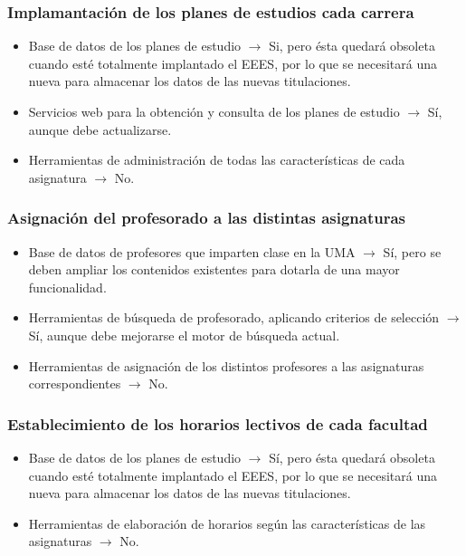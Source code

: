 \documentclass[11pt,a4paper,spanish,twoside]{book}
\begin{document}
\subsubsection{Implamantación de los planes de estudios cada carrera}
\begin{itemize}
\item Base de datos de los planes de estudio $\to$ Si, pero ésta quedará
  obsoleta cuando esté totalmente implantado el EEES, por lo que se
  necesitará una nueva para almacenar los datos de las nuevas titulaciones. 
\item Servicios web para la obtención y consulta de los planes de estudio
  $\to$ Sí, aunque debe actualizarse. 
\item Herramientas de administración de todas las características de cada
  asignatura $\to$ No. 
\end{itemize}

\subsubsection{Asignación del profesorado a las distintas asignaturas}
\begin{itemize}
\item Base de datos de profesores que imparten clase en la UMA $\to$ Sí, pero
  se deben ampliar los contenidos existentes para dotarla de una mayor
  funcionalidad. 
\item Herramientas de búsqueda de profesorado, aplicando criterios de
  selección $\to$ Sí, aunque debe mejorarse el motor de búsqueda actual. 
\item Herramientas de asignación de los distintos profesores a las
  asignaturas correspondientes $\to$ No.
\end{itemize}

\subsubsection{Establecimiento de los horarios lectivos de cada facultad}
\begin{itemize}
\item Base de datos de los planes de estudio $\to$ Sí, pero ésta quedará
  obsoleta cuando esté totalmente implantado el EEES, por lo que se
  necesitará una nueva para almacenar los datos de las nuevas titulaciones. 
\item Herramientas de elaboración de horarios según las características de
  las asignaturas $\to$ No. 
\end{itemize}
\end{document}
